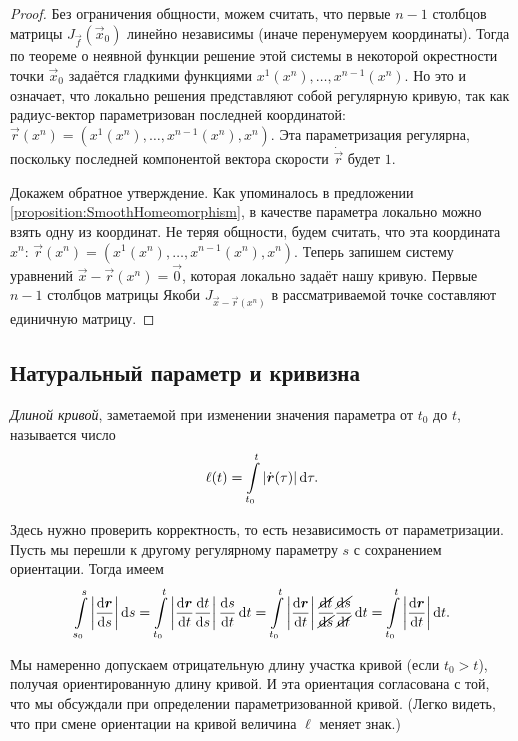 \begin{proof}
	Без ограничения общности, можем считать, что первые $n - 1$ столбцов матрицы $J_{\vec{f}}(\vec{x}_0)$ линейно независимы (иначе перенумеруем координаты). Тогда по теореме о неявной функции решение этой системы в некоторой окрестности точки $\vec{x}_0$ задаётся гладкими функциями $x^1(x^n), \ldots, x^{n - 1}(x^n)$. Но это и означает, что локально решения представляют собой регулярную кривую, так как радиус-вектор параметризован последней координатой: $\vec{r}(x^n) = (x^1(x^n), \ldots, x^{n - 1}(x^n), x^n)$. Эта параметризация регулярна, поскольку последней компонентой вектора скорости $\dot{\vec{r}}$ будет $1$.

	Докажем обратное утверждение. Как упоминалось в предложении \ref{proposition:SmoothHomeomorphism}, в качестве параметра локально можно взять одну из координат. Не теряя общности, будем считать, что эта координата $x^n$: $\vec{r}(x^n) = (x^1(x^n), \ldots, x^{n - 1}(x^n), x^n)$. Теперь запишем систему уравнений $\vec{x} - \vec{r}(x^n) = \vec{0}$, которая локально задаёт нашу кривую. Первые $n - 1$ столбцов матрицы Якоби $J_{\vec{x} - \vec{r}(x^n)}$ в рассматриваемой точке составляют единичную матрицу.
\end{proof}

\subsection{Натуральный параметр и кривизна}

\begin{definition}
	\textit{Длиной кривой}, заметаемой при изменении значения параметра от $t_0$ до $t$, называется число
	\[
		\ell(t) = \int\limits_{t_0}^t\left\lvert\dot{\boldsymbol{r}}(\tau)\right\rvert\mathop{}\!\mathrm{d}\tau.
	\]
\end{definition}

Здесь нужно проверить корректность, то есть независимость от параметризации. Пусть мы перешли к другому регулярному параметру $s$ с сохранением ориентации. Тогда имеем
\[
	\int\limits_{s_0}^s\abs{\frac{\d\vec{r}}{\d s}}\d s = \int\limits_{t_0}^t\abs{\frac{\d\vec{r}}{\d t}\frac{\d t}{\d s}}\frac{\d s}{\d t}\d t = \int\limits_{t_0}^t\abs{\frac{\d\vec{r}}{\d t}}\frac{\cancel{\d t}}{\cancel{\d s}}\frac{\cancel{\d s}}{\cancel{\d t}}\d t = \int\limits_{t_0}^t\abs{\frac{\d\vec{r}}{\d t}}\d t.
\]

Мы намеренно допускаем отрицательную длину участка кривой (если $t_0 > t$), получая ориентированную длину кривой. И эта ориентация согласована с той, что мы обсуждали при определении параметризованной кривой. (Легко видеть, что при смене ориентации на кривой величина $\ell$ меняет знак.)

